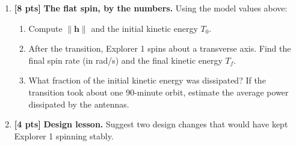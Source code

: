\documentclass[11pt,letterpaper]{article}
\newcommand{\answerspace}[1]{\par\vspace{#1}}
\newcommand{\exampagebreak}{\newpage}
\newcommand{\pts}[1]{\textbf{[#1 pts]}}
\newcommand{\bh}{\mathbf{h}}
\begin{document}
\begin{enumerate}[label=(\alph*)]
\item \pts{8} \textbf{The flat spin, by the numbers.} Using the model values above:
\begin{enumerate}[label=(\roman*)]
    \item Compute $\lVert\bh\rVert$ and the initial kinetic energy $T_0$.
\answerspace{1.6in}
    \item After the transition, Explorer 1 spins about a transverse axis. Find the final spin rate (in rad/s) and the final kinetic energy $T_f$.
\answerspace{2.0in}
    \item What fraction of the initial kinetic energy was dissipated? If the transition took about one 90-minute orbit, estimate the average power dissipated by the antennas.
\answerspace{2.0in}
\end{enumerate}
\exampagebreak

\item \pts{4} \textbf{Design lesson.} Suggest two design changes that would have kept Explorer 1 spinning stably.
\answerspace{4.0in}

\end{enumerate}
\end{document}
